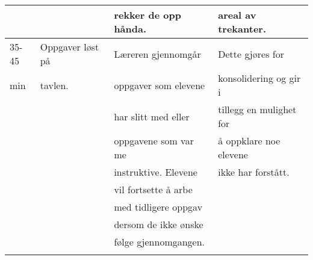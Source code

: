 \documentclass{article}
\begin{document}
\begin{center}
\begin{tabular}{l|l|l|l}
 &  & rekker de opp hånda. & areal av trekanter.\\
\hline
35-45 & Oppgaver løst på & Læreren gjennomgår & Dette gjøres for\\
min & tavlen. & oppgaver som elevene & konsolidering og gir i\\
 &  & har slitt med eller & tillegg en mulighet for\\
 &  & oppgavene som var me & å oppklare noe elevene\\
 &  & instruktive. Elevene & ikke har forstått.\\
 &  & vil fortsette å arbe & \\
 &  & med tidligere oppgav & \\
 &  & dersom de ikke ønske & \\
 &  & følge gjennomgangen. & \\
 &  &  & \\
\end{tabular}
\end{center}
\section*{}
\label{sec-3}
\section*{}
\label{sec-4}
\end{document}
